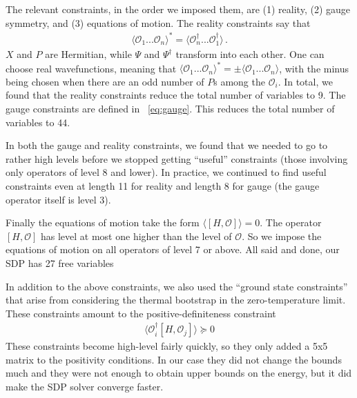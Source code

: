 \documentclass[a4paper,11pt]{article}
\numberwithin{equation}{section}
\begin{document}
The relevant constraints, in the order we imposed them, are (1) reality, (2) gauge symmetry, and (3) equations of motion. The reality constraints say that
%
\begin{align}
    \langle \mathcal O_1 ... \mathcal O_n \rangle^* = \langle \mathcal O_n^\dagger ... \mathcal O_1^\dagger \rangle \, .
\end{align}
%
$X$ and $P$ are Hermitian, while $\Psi$ and $\Psi^\dagger$ transform into each other. One can choose real wavefunctions, meaning that $\langle \mathcal O_1 ... \mathcal O_n \rangle^* = \pm\langle \mathcal O_1 ... \mathcal O_n \rangle$, with the minus being chosen when there are an odd number of $P$s among the $\mathcal O_i$. In total, we found that the reality constraints reduce the total number of variables to 9. The gauge constraints are defined in ~\eqref{eq:gauge}. This reduces the total number of variables to 44.

In both the gauge and reality constraints, we found that we needed to go to rather high levels before we stopped getting ``useful'' constraints (those involving only operators of level 8 and lower). In practice, we continued to find useful constraints even at length 11 for reality and length 8 for gauge (the gauge operator itself is level 3). 

Finally the equations of motion take the form $ \langle [H, \mathcal O] \rangle = 0$. The operator $ [H, \mathcal O]$ has level at most one higher than the level of $\mathcal O$. So we impose the equations of motion on all operators of level 7 or above. All said and done, our SDP has 27 free variables

In addition to the above constraints, we also used the ``ground state constraints'' that arise from considering the thermal bootstrap \cite{Fawzi:2023fpg, Cho:2024kxn} in the zero-temperature limit. These constraints amount to the positive-definiteness constraint
%
\begin{align}
    \langle \mathcal O_i^\dagger [ H , \mathcal O_j] \rangle \succeq 0
\end{align}
%
These constraints become high-level fairly quickly, so they only added a 5x5 matrix to the positivity conditions. In our case they did not change the bounds much and they were not enough to obtain upper bounds on the energy, but it did make the SDP solver converge faster. 
\end{document}
